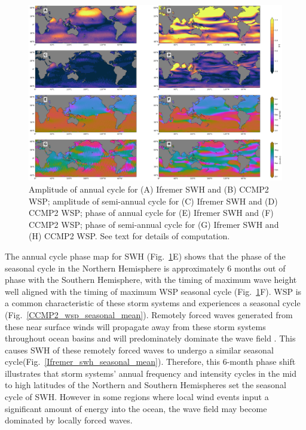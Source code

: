 \documentclass[draft,linenumbers]{agujournal2018}
\begin{document}
\begin{figure}[tbh]
\centering
\includegraphics[width=1.0\textwidth]{figs/lsf_parameters/ccmp2_ifremer_lsf_parameters_5_par_fit_paper.png}
\caption{Amplitude of annual cycle for (A) Ifremer SWH and (B) CCMP2 WSP; amplitude of semi-annual cycle for (C) Ifremer SWH and (D) CCMP2 WSP; phase of annual cycle for (E) Ifremer SWH and (F) CCMP2 WSP; phase of semi-annual cycle for (G) Ifremer SWH and (H) CCMP2 WSP.  See text for details of computation.}
\label{Ifremer_ccmp2_lsf_chars}
\end{figure}

The annual cycle phase map for SWH (Fig.~\ref{Ifremer_ccmp2_lsf_chars}E) shows that the phase of the seasonal cycle in the Northern Hemisphere is approximately 6 months out of phase with the Southern Hemisphere, with the timing of maximum wave height well aligned with the timing of maximum WSP seasonal cycle (Fig.~\ref{Ifremer_ccmp2_lsf_chars}F). WSP is a common characteristic of these storm systems and experiences a seasonal cycle (Fig.~\ref{CCMP2_wsp_seasonal_mean}). Remotely forced waves generated from these near surface winds will propagate away from these storm systems throughout ocean basins and will predominately dominate the wave field \cite{semedo2011global}. This causes SWH of these remotely forced waves to undergo a similar seasonal cycle(Fig.~\ref{Ifremer_swh_seasonal_mean}). Therefore, this 6-month phase shift illustrates that storm systems' annual frequency and intensity cycles in the mid to high latitudes of the Northern and Southern Hemispheres set the seasonal cycle of SWH. However in some regions where local wind events input a significant amount of energy into the ocean, the wave field may become dominated by locally forced waves.
\end{document}
